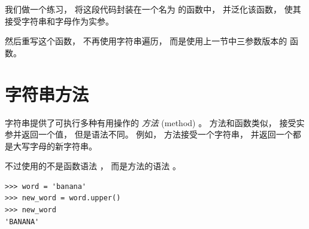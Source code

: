 

我们做一个练习， 将这段代码封装在一个名为  的函数中， 并泛化该函数， 使其接受字符串和字母作为实参。


然后重写这个函数， 不再使用字符串遍历， 而是使用上一节中三参数版本的  函数。

\section{字符串方法}
\label{optional}

  

字符串提供了可执行多种有用操作的 {\em 方法} (method) 。  方法和函数类似， 接受实参并返回一个值， 但是语法不同。  例如，  方法接受一个字符串， 并返回一个都是大写字母的新字符串。
  


不过使用的不是函数语法  ， 而是方法的语法 。

\begin{lstlisting}
>>> word = 'banana'
>>> new_word = word.upper()
>>> new_word
'BANANA'
\end{lstlisting}

%
  

